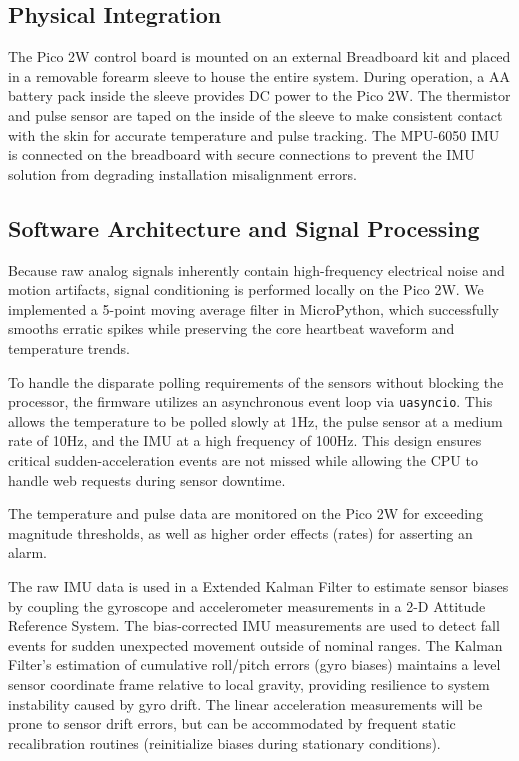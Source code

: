 \documentclass[conference]{IEEEtran}
\begin{document}
\subsection{Physical Integration}
The Pico 2W control board is mounted on an external Breadboard kit and placed in a removable forearm sleeve to house the entire system. During operation, a AA battery pack inside the sleeve provides DC power to the Pico 2W. The thermistor and pulse sensor are taped on the inside of the sleeve to make consistent contact with the skin for accurate temperature and pulse tracking. The MPU-6050 IMU is connected on the breadboard with secure connections to prevent the IMU solution from degrading installation misalignment errors.

\subsection{Software Architecture and Signal Processing}
Because raw analog signals inherently contain high-frequency electrical noise and motion artifacts, signal conditioning is performed locally on the Pico 2W. We implemented a 5-point moving average filter in MicroPython, which successfully smooths erratic spikes while preserving the core heartbeat waveform and temperature trends.

To handle the disparate polling requirements of the sensors without blocking the processor, the firmware utilizes an asynchronous event loop via \texttt{uasyncio}. This allows the temperature to be polled slowly at 1Hz, the pulse sensor at a medium rate of 10Hz, and the IMU at a high frequency of 100Hz. This design ensures critical sudden-acceleration events are not missed while allowing the CPU to handle web requests during sensor downtime.

The temperature and pulse data are monitored on the Pico 2W for exceeding magnitude thresholds, as well as higher order effects (rates) for asserting an alarm.

The raw IMU data is used in a Extended Kalman Filter to estimate sensor biases by coupling the gyroscope and accelerometer measurements in a 2-D Attitude Reference System. The bias-corrected IMU measurements are used to detect fall events for sudden unexpected movement outside of nominal ranges. The Kalman Filter's estimation of cumulative roll/pitch errors (gyro biases) maintains a level sensor coordinate frame relative to local gravity, providing resilience to system instability caused by gyro drift. The linear acceleration measurements will be prone to sensor drift errors, but can be accommodated by frequent static recalibration routines (reinitialize biases during stationary conditions). 
\end{document}
